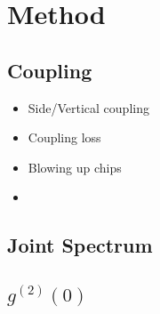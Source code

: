 \section{Method}
\subsection{Coupling}
\begin{itemize}
\item Side/Vertical coupling
\item Coupling loss
\item Blowing up chips
\item 
\end{itemize}
\subsection{Joint Spectrum}

\subsection{$g^{(2)}(0)$}